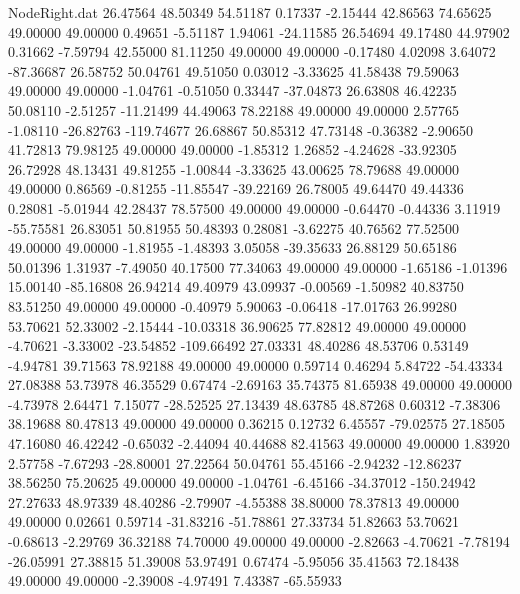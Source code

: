 \begin{filecontents}{NodeRight.dat}
  26.47564   48.50349   54.51187     0.17337   -2.15444   42.86563   74.65625   49.00000   49.00000    0.49651   -5.51187    1.94061  -24.11585
  26.54694   49.17480   44.97902     0.31662   -7.59794   42.55000   81.11250   49.00000   49.00000   -0.17480    4.02098    3.64072  -87.36687
  26.58752   50.04761   49.51050     0.03012   -3.33625   41.58438   79.59063   49.00000   49.00000   -1.04761   -0.51050    0.33447  -37.04873
  26.63808   46.42235   50.08110    -2.51257  -11.21499   44.49063   78.22188   49.00000   49.00000    2.57765   -1.08110  -26.82763 -119.74677
  26.68867   50.85312   47.73148    -0.36382   -2.90650   41.72813   79.98125   49.00000   49.00000   -1.85312    1.26852   -4.24628  -33.92305
  26.72928   48.13431   49.81255    -1.00844   -3.33625   43.00625   78.79688   49.00000   49.00000    0.86569   -0.81255  -11.85547  -39.22169
  26.78005   49.64470   49.44336     0.28081   -5.01944   42.28437   78.57500   49.00000   49.00000   -0.64470   -0.44336    3.11919  -55.75581
  26.83051   50.81955   50.48393     0.28081   -3.62275   40.76562   77.52500   49.00000   49.00000   -1.81955   -1.48393    3.05058  -39.35633
  26.88129   50.65186   50.01396     1.31937   -7.49050   40.17500   77.34063   49.00000   49.00000   -1.65186   -1.01396   15.00140  -85.16808
  26.94214   49.40979   43.09937    -0.00569   -1.50982   40.83750   83.51250   49.00000   49.00000   -0.40979    5.90063   -0.06418  -17.01763
  26.99280   53.70621   52.33002    -2.15444  -10.03318   36.90625   77.82812   49.00000   49.00000   -4.70621   -3.33002  -23.54852 -109.66492
  27.03331   48.40286   48.53706     0.53149   -4.94781   39.71563   78.92188   49.00000   49.00000    0.59714    0.46294    5.84722  -54.43334
  27.08388   53.73978   46.35529     0.67474   -2.69163   35.74375   81.65938   49.00000   49.00000   -4.73978    2.64471    7.15077  -28.52525
  27.13439   48.63785   48.87268     0.60312   -7.38306   38.19688   80.47813   49.00000   49.00000    0.36215    0.12732    6.45557  -79.02575
  27.18505   47.16080   46.42242    -0.65032   -2.44094   40.44688   82.41563   49.00000   49.00000    1.83920    2.57758   -7.67293  -28.80001
  27.22564   50.04761   55.45166    -2.94232  -12.86237   38.56250   75.20625   49.00000   49.00000   -1.04761   -6.45166  -34.37012 -150.24942
  27.27633   48.97339   48.40286    -2.79907   -4.55388   38.80000   78.37813   49.00000   49.00000    0.02661    0.59714  -31.83216  -51.78861
  27.33734   51.82663   53.70621    -0.68613   -2.29769   36.32188   74.70000   49.00000   49.00000   -2.82663   -4.70621   -7.78194  -26.05991
  27.38815   51.39008   53.97491     0.67474   -5.95056   35.41563   72.18438   49.00000   49.00000   -2.39008   -4.97491    7.43387  -65.55933

\end{filecontents}
